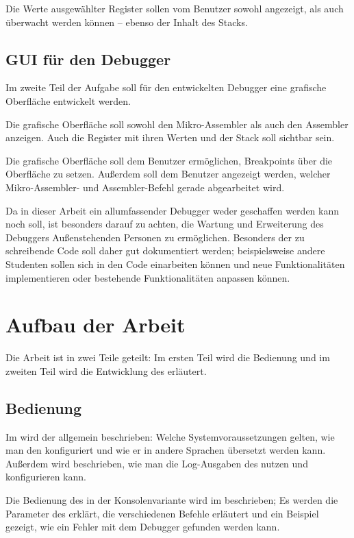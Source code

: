 Die Werte ausgewählter Register sollen vom Benutzer sowohl angezeigt, als auch überwacht werden können -- ebenso der Inhalt des Stacks.

\subsection*{GUI für den Debugger}
Im zweite Teil der Aufgabe soll für den entwickelten Debugger eine grafische  Oberfläche entwickelt werden.

Die grafische Oberfläche soll sowohl den Mikro-Assembler als auch den Assembler anzeigen. Auch die Register mit ihren Werten und der Stack soll sichtbar sein.

Die grafische Oberfläche soll dem Benutzer ermöglichen, Breakpoints über die Oberfläche zu setzen. Außerdem soll dem Benutzer angezeigt werden, welcher Mikro-Assembler- und Assembler-Befehl gerade abgearbeitet wird.

Da in dieser Arbeit ein allumfassender Debugger weder geschaffen werden kann noch soll, ist besonders darauf zu achten, die Wartung und Erweiterung des Debuggers Außenstehenden Personen zu ermöglichen. Besonders der zu schreibende Code soll daher gut dokumentiert werden; beispielsweise andere Studenten sollen sich in den Code einarbeiten können und neue Funktionalitäten implementieren oder bestehende Funktionalitäten anpassen können.

\section*{Aufbau der Arbeit}
Die Arbeit ist in zwei Teile geteilt: Im ersten Teil wird die Bedienung und im zweiten Teil wird die Entwicklung des \md erläutert.

\subsection*{Bedienung}
Im  wird der \md allgemein beschrieben: Welche Systemvoraussetzungen gelten, wie man den \md konfiguriert und wie er in andere Sprachen übersetzt werden kann. Außerdem wird beschrieben, wie man die Log-Ausgaben des \md nutzen und konfigurieren kann.

Die Bedienung des \md in der Konsolenvariante wird im  beschrieben; Es werden die Parameter des \md erklärt, die verschiedenen Befehle erläutert und ein Beispiel gezeigt, wie ein Fehler mit dem Debugger gefunden werden kann.

